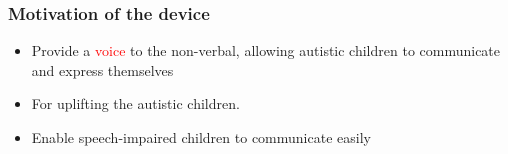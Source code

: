\documentclass[12pt]{beamer}
\begin{document}
{
\begin{frame}
	\frametitle {Motivation of the device}
	\begin{itemize}
		\item Provide a \textcolor{red}{voice} to the non-verbal, allowing autistic children to communicate and express themselves
		\item For uplifting the autistic children.
		\item Enable speech-impaired children to communicate easily 
	\end{itemize}
\end{frame}
}
\end{document}
